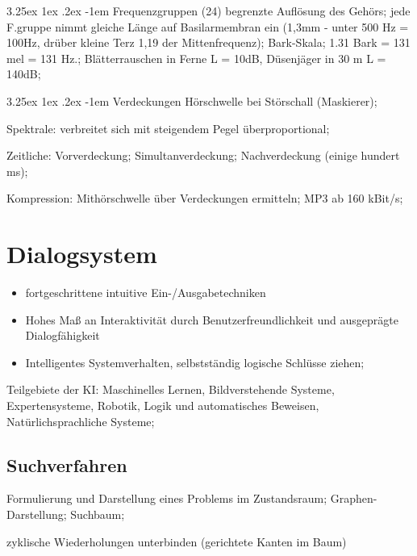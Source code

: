 \documentclass[german,color,6pt]{latex4ei/latex4ei_sheet}
\makeatletter
\renewcommand\paragraph{\@startsection{paragraph}{4}{\z@}%
                                    {3.25ex \@plus1ex \@minus.2ex}%
                                    {-1em}%
                                    {\normalfont\normalsize\bfseries}}
\makeatother
\begin{document}
\begin{sectionbox}
\paragraph{Frequenzgruppen} (24) begrenzte Auflösung des Gehörs; jede F.gruppe nimmt gleiche Länge auf Basilarmembran ein (1,3mm - unter 500 Hz = 100Hz, drüber kleine Terz 1,19 der Mittenfrequenz); Bark-Skala; 1.31 Bark = 131 mel = 131 Hz.; Blätterrauschen in Ferne L = 10dB, Düsenjäger in 30 m L = 140dB; 

\paragraph{Verdeckungen} Hörschwelle bei Störschall (Maskierer); 

Spektrale: verbreitet sich mit steigendem Pegel überproportional; 

Zeitliche: Vorverdeckung; Simultanverdeckung; Nachverdeckung (einige hundert ms); 

Kompression: Mithörschwelle über Verdeckungen ermitteln; MP3 ab 160 kBit/s; 
\end{sectionbox}

\section{Dialogsystem}
\begin{symbolbox}
\begin{itemize}
	\item fortgeschrittene intuitive Ein-/Ausgabetechniken 
	\item Hohes Maß an Interaktivität durch Benutzerfreundlichkeit und ausgeprägte Dialogfähigkeit
	\item Intelligentes Systemverhalten, selbstständig logische Schlüsse ziehen; 
\end{itemize}
\end{symbolbox}
Teilgebiete der KI: Maschinelles Lernen, Bildverstehende Systeme, Expertensysteme, Robotik, Logik und automatisches Beweisen, Natürlichsprachliche Systeme; 

\subsection{Suchverfahren}
\begin{symbolbox}
Formulierung und Darstellung eines Problems im Zustandsraum; Graphen-Darstellung; Suchbaum;
\end{symbolbox}

\begin{emphbox}
 zyklische Wiederholungen unterbinden (gerichtete Kanten im Baum)
\end{emphbox}
\end{document}
